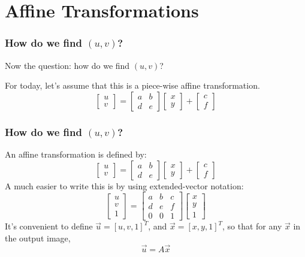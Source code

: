 \documentclass{beamer}
\begin{document}
\section{Affine Transformations}
\setcounter{subsection}{1}

\begin{frame}
  \frametitle{How do we find $(u,v)$?}
  Now the question: how do we find $(u,v)$?

  For today, let's assume that this is a piece-wise affine transformation.
  \[
  \left[\begin{array}{c} u\\v\end{array}\right]=
  \left[\begin{array}{cc}a&b\\d&e\end{array}\right]
  \left[\begin{array}{c}x\\y\end{array}\right] +
  \left[\begin{array}{c}c\\f\end{array}\right]
  \]
\end{frame}
  
\begin{frame}
  \frametitle{How do we find $(u,v)$?}
  An affine transformation is defined by:
  \[
  \left[\begin{array}{c} u\\v\end{array}\right]=
  \left[\begin{array}{cc}a&b\\d&e\end{array}\right]
  \left[\begin{array}{c}x\\y\end{array}\right] +
  \left[\begin{array}{c}c\\f\end{array}\right]
  \]
  A much easier to write this is by using extended-vector notation:
  \[
  \left[\begin{array}{c} u\\v\\1\end{array}\right]=
  \left[\begin{array}{ccc}a&b&c\\d&e&f\\0&0&1\end{array}\right]
  \left[\begin{array}{c}x\\y\\1\end{array}\right]
  \]
  It's convenient to define $\vec{u}=[u,v,1]^T$, and
  $\vec{x}=[x,y,1]^T$, so that for any $\vec{x}$ in the
  output image,
  \[
  \vec{u}=A \vec{x}
  \]
\end{frame}
  
\end{document}
